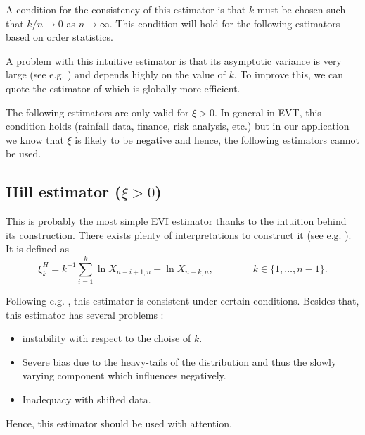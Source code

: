 A condition for the consistency of this estimator is that $k$ must be chosen such that $k/n\rightarrow 0$ as $n\rightarrow \infty$. This condition will hold for the following estimators based on order statistics.

A problem with this intuitive estimator is that its asymptotic variance is very large (see e.g. \cite{dekkers_estimation_1989}) and depends highly on the value of $k$. To improve this, we can quote the estimator of \cite{segers_generalized_2001} which is globally more efficient.%


\vspace{0.1cm}
The following estimators are only valid for $\xi>0$. In general in EVT, this condition holds (rainfall data, finance, risk analysis, etc.) but in our application we know that $\xi$ is likely to be negative and hence, the following estimators cannot be used.


\subsection*{Hill estimator ($\xi>0$)}


This is probably the most simple EVI estimator thanks to the intuition behind its construction. There exists plenty of interpretations to construct it (see e.g. \citet[pp.101-104]{beirlant_statistics_2006}). 
It is defined as 
\begin{equation}
\xi^H_{k}=k^{-1}\sum_{i=1}^k\ln X_{n-i+1,n}-\ln X_{n-k,n}, \qquad\qquad k\in\{1,\dots,n-1\}.
\end{equation}



Following e.g. \cite{dehaan_asymp_1998}, this estimator is consistent under certain conditions. Besides that, this estimator has several problems : 

\begin{itemize}
	\item instability with respect to the choise of $k$.
	\item Severe bias due to the heavy-tails of the distribution and thus the slowly varying component which influences negatively.
	\item Inadequacy with shifted data.
\end{itemize}
Hence, this estimator should be used with attention.


